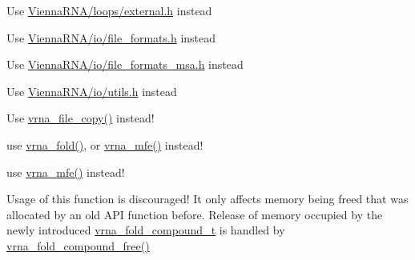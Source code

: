 \begin{DoxyRefList}
\item[\label{deprecated__deprecated000061}%
\Hypertarget{deprecated__deprecated000061}%
File \hyperlink{exterior__loops_8h}{exterior\+\_\+loops.h} ]Use \hyperlink{external_8h}{Vienna\+R\+N\+A/loops/external.\+h} instead  
\item[\label{deprecated__deprecated000062}%
\Hypertarget{deprecated__deprecated000062}%
File \hyperlink{file__formats_8h}{file\+\_\+formats.h} ]Use \hyperlink{io_2file__formats_8h}{Vienna\+R\+N\+A/io/file\+\_\+formats.\+h} instead  
\item[\label{deprecated__deprecated000063}%
\Hypertarget{deprecated__deprecated000063}%
File \hyperlink{file__formats__msa_8h}{file\+\_\+formats\+\_\+msa.h} ]Use \hyperlink{io_2file__formats__msa_8h}{Vienna\+R\+N\+A/io/file\+\_\+formats\+\_\+msa.\+h} instead  
\item[\label{deprecated__deprecated000064}%
\Hypertarget{deprecated__deprecated000064}%
File \hyperlink{file__utils_8h}{file\+\_\+utils.h} ]Use \hyperlink{io_2utils_8h}{Vienna\+R\+N\+A/io/utils.\+h} instead  
\item[\label{deprecated__deprecated000175}%
\Hypertarget{deprecated__deprecated000175}%
Global \hyperlink{utils_2basic_8h_ab213334ce977b6d21611cdea6b80c3bf}{filecopy} (F\+I\+LE $\ast$from, F\+I\+LE $\ast$to)]Use \hyperlink{group__file__utils_ga4382a56d2fee9ed738364b99329edc7c}{vrna\+\_\+file\+\_\+copy()} instead!  
\item[\label{deprecated__deprecated000067}%
\Hypertarget{deprecated__deprecated000067}%
Global \hyperlink{group__mfe__global__deprecated_gaadafcb0f140795ae62e5ca027e335a9b}{fold} (const char $\ast$sequence, char $\ast$structure)]use \hyperlink{group__mfe__global_ga29a33b2895f4e67b0480271ff289afdc}{vrna\+\_\+fold()}, or \hyperlink{group__mfe__global_gabd3b147371ccf25c577f88bbbaf159fd}{vrna\+\_\+mfe()} instead! 
\item[\label{deprecated__deprecated000066}%
\Hypertarget{deprecated__deprecated000066}%
Global \hyperlink{group__mfe__global__deprecated_ga2bc41df5d71fee6fd8da9904ee65d8fb}{fold\+\_\+par} (const char $\ast$sequence, char $\ast$structure, vrna\+\_\+param\+\_\+t $\ast$parameters, int is\+\_\+constrained, int is\+\_\+circular)]use \hyperlink{group__mfe__global_gabd3b147371ccf25c577f88bbbaf159fd}{vrna\+\_\+mfe()} instead! 
\item[\label{deprecated__deprecated000014}%
\Hypertarget{deprecated__deprecated000014}%
Global \hyperlink{group__mfe__global__deprecated_ga72095e4554b5d577250ea14c42acc49e}{free\+\_\+alifold\+\_\+arrays} (void)]Usage of this function is discouraged! It only affects memory being free\textquotesingle{}d that was allocated by an old A\+PI function before. Release of memory occupied by the newly introduced \hyperlink{group__fold__compound_ga1b0cef17fd40466cef5968eaeeff6166}{vrna\+\_\+fold\+\_\+compound\+\_\+t} is handled by \hyperlink{group__fold__compound_ga576a077b418a9c3650e06f8e5d296fc2}{vrna\+\_\+fold\+\_\+compound\+\_\+free()} 

\end{DoxyRefList}
